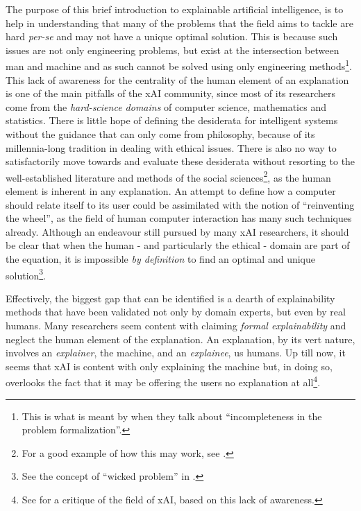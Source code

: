 The purpose of this brief introduction to explainable artificial intelligence, is to help in understanding that many of the problems that the field aims to tackle are hard \textit{per-se} and may not have a unique optimal solution.  
This is because such issues are not only engineering problems, but exist at the intersection between man and machine and as such cannot be solved using only engineering methods\footnote{This is what is meant by \citet{doshi2017towards} when they talk about \enquote{incompleteness in the problem formalization}.}.  
This lack of awareness for the centrality of the human element of an explanation is one of the main pitfalls of the xAI community, since most of its researchers come from the \textit{hard-science domains} of computer science, mathematics and statistics. 
There is little hope of defining the desiderata for intelligent systems without the guidance that can only come from philosophy, because of its millennia-long tradition in dealing with ethical issues.  
There is also no way to satisfactorily move towards and evaluate these desiderata without resorting to the well-established literature and methods of the social sciences\footnote{For a good example of how this may work, see \citet{stumpf2009interacting}.}, as the human element is inherent in any explanation. 
An attempt to define how a computer should relate itself to its user could be assimilated with the notion of \enquote{reinventing the wheel}, as the field of human computer interaction has many such techniques already. 
Although an endeavour still pursued by many xAI researchers, it should be clear that when the human - and particularly the ethical - domain are part of the equation, it is impossible \textit{by definition} to find an optimal and unique solution\footnote{See the concept of \enquote{wicked problem} in \citep{Rittel1973}.}.

Effectively, the biggest gap that can be identified is a dearth of explainability methods that have been validated not only by domain experts, but even by real humans.
Many researchers seem content with claiming \textit{formal explainability} and neglect the human element of the explanation.
An explanation, by its vert nature, involves an \textit{explainer}, the machine, and an \textit{explainee}, us humans.
Up till now, it seems that xAI is content with only explaining the machine but, in doing so, overlooks the fact that it may be offering the users no explanation at all\footnote{See \citet{mittelstadt2019explaining} for a critique of the field of xAI, based on this lack of awareness.}.
